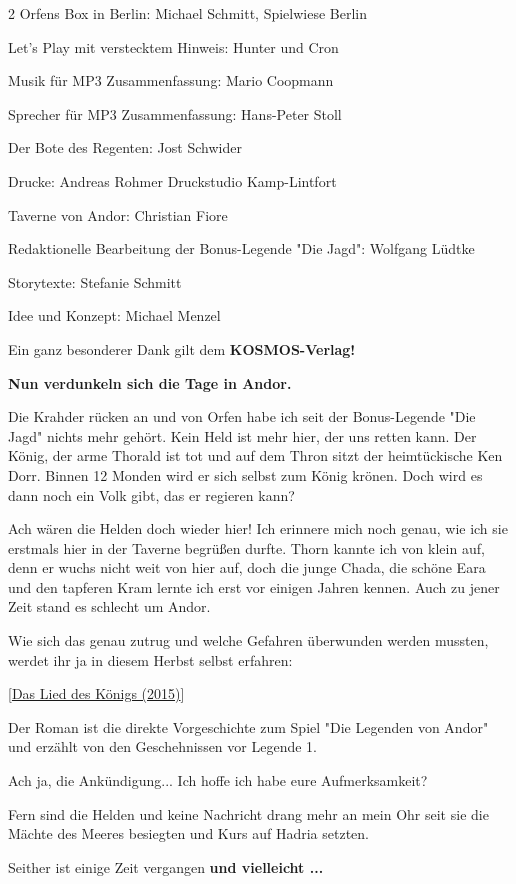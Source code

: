 \documentclass[10pt, a4paper, oneside]{book}
\begin{document}
\begin{multicols}{2}
Orfens Box in Berlin: Michael Schmitt, Spielwiese Berlin

Let’s Play mit verstecktem Hinweis: Hunter und Cron

Musik für MP3 Zusammenfassung: Mario Coopmann

Sprecher für MP3 Zusammenfassung: Hans-Peter Stoll

Der Bote des Regenten: Jost Schwider

Drucke: Andreas Rohmer Druckstudio Kamp-Lintfort

Taverne von Andor: Christian Fiore

Redaktionelle Bearbeitung der Bonus-Legende "Die Jagd": Wolfgang Lüdtke

Storytexte: Stefanie Schmitt

Idee und Konzept: Michael Menzel

Ein ganz besonderer Dank gilt dem \textbf{KOSMOS-Verlag!}

\textbf{Nun verdunkeln sich die Tage in Andor.}

Die Krahder rücken an und von Orfen habe ich seit der Bonus-Legende "Die Jagd" nichts mehr gehört. Kein Held ist mehr hier, der uns retten kann. Der König, der arme Thorald ist tot und auf dem Thron sitzt der heimtückische Ken Dorr. Binnen 12 Monden wird er sich selbst zum König krönen. Doch wird es dann noch ein Volk gibt, das er regieren kann?

Ach wären die Helden doch wieder hier! Ich erinnere mich noch genau, wie ich sie erstmals hier in der Taverne begrüßen durfte. Thorn kannte ich von klein auf, denn er wuchs nicht weit von hier auf, doch die junge Chada, die schöne Eara und den tapferen Kram lernte ich erst vor einigen Jahren kennen. Auch zu jener Zeit stand es schlecht um Andor.

Wie sich das genau zutrug und welche Gefahren überwunden werden mussten, werdet ihr ja in diesem Herbst selbst erfahren:

[\hyperref[produkt-2015-das-lied-des-koenigs]{Das Lied des Königs (2015)}]

Der Roman ist die direkte Vorgeschichte zum Spiel "Die Legenden von Andor" und erzählt von den Geschehnissen vor Legende 1.


Ach ja, die Ankündigung... Ich hoffe ich habe eure Aufmerksamkeit?

Fern sind die Helden und keine Nachricht drang mehr an mein Ohr seit sie die Mächte des Meeres besiegten und Kurs auf Hadria setzten.

Seither ist einige Zeit vergangen \textbf{und vielleicht ...}


\end{multicols}
\end{document}
